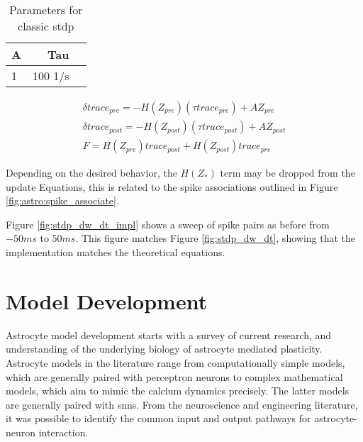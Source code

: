 \begin{table}[!htp] \centering
  \caption{Parameters for classic \gls{stdp}} \label{table:classic_stdp_params}
  \scriptsize
  \begin{tabular}{lrr}\toprule
    A &Tau \\\midrule
    1 &100 1/s \\
    \bottomrule
  \end{tabular}
\end{table}


\begin{align}
  \delta trace_{pre} = -H(Z_{pre})(\tau trace_{pre}) +
  A Z_{pre} \label{eq:song_impl_pre} \\ 
  \delta trace_{post} = -H(Z_{post})(\tau trace_{post}) +
  A Z_{post} \label{eq:song_impl_post} \\
  F = H(Z_{pre}) trace_{post} + H(Z_{post}) trace_{pre} \label{eq:song_impl_dw}
\end{align}

Depending on the desired behavior, the $H(Z_*)$ term may be dropped from the
update Equations, this is related to the spike associations outlined in Figure
\ref{fig:astro:spike_associate}.

Figure \ref{fig:stdp_dw_dt_impl} shows a sweep of spike pairs as before from
$-50ms$ to $50ms$. This figure matches Figure \ref{fig:stdp_dw_dt}, showing that
the implementation matches the theoretical equations.


\section{Model Development}
Astrocyte model development starts with a survey of current research, and
understanding of the underlying biology of astrocyte mediated
plasticity. Astrocyte models in the literature range from computationally simple
models, which are generally paired with perceptron neurons to complex
mathematical models, which aim to mimic the calcium dynamics precisely. The
latter models are generally paired with \glspl{snn}. From the neuroscience and
engineering literature, it was possible to identify the common input and output
pathways for astrocyte-neuron interaction.

